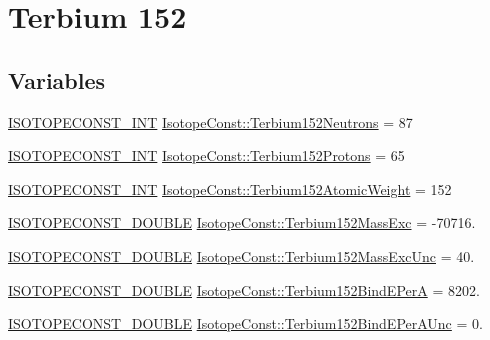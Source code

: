 \hypertarget{group___isotope_const-_terbium-_tb152}{}\section{Terbium 152}
\label{group___isotope_const-_terbium-_tb152}
\subsection*{Variables}
\begin{DoxyCompactItemize}
\item 
\mbox{\hyperlink{group___isotope_const-_macros_ga5f18360b3e99483a35c32d789e62621c}{I\+S\+O\+T\+O\+P\+E\+C\+O\+N\+S\+T\+\_\+\+I\+NT}} \mbox{\hyperlink{group___isotope_const-_terbium-_tb152_ga7084ce1979962d273910095e5ab62c83}{Isotope\+Const\+::\+Terbium152\+Neutrons}} = 87
\item 
\mbox{\hyperlink{group___isotope_const-_macros_ga5f18360b3e99483a35c32d789e62621c}{I\+S\+O\+T\+O\+P\+E\+C\+O\+N\+S\+T\+\_\+\+I\+NT}} \mbox{\hyperlink{group___isotope_const-_terbium-_tb152_ga96676ed9d2f7e475e2cee77dff170939}{Isotope\+Const\+::\+Terbium152\+Protons}} = 65
\item 
\mbox{\hyperlink{group___isotope_const-_macros_ga5f18360b3e99483a35c32d789e62621c}{I\+S\+O\+T\+O\+P\+E\+C\+O\+N\+S\+T\+\_\+\+I\+NT}} \mbox{\hyperlink{group___isotope_const-_terbium-_tb152_gab507a2dcf9811171356e963bf4bd3e6c}{Isotope\+Const\+::\+Terbium152\+Atomic\+Weight}} = 152
\item 
\mbox{\hyperlink{group___isotope_const-_macros_ga8f45a7272ce02c0b4c65c44636ed719a}{I\+S\+O\+T\+O\+P\+E\+C\+O\+N\+S\+T\+\_\+\+D\+O\+U\+B\+LE}} \mbox{\hyperlink{group___isotope_const-_terbium-_tb152_ga27305763a969a2954fe129cad439f58e}{Isotope\+Const\+::\+Terbium152\+Mass\+Exc}} = -\/70716.
\item 
\mbox{\hyperlink{group___isotope_const-_macros_ga8f45a7272ce02c0b4c65c44636ed719a}{I\+S\+O\+T\+O\+P\+E\+C\+O\+N\+S\+T\+\_\+\+D\+O\+U\+B\+LE}} \mbox{\hyperlink{group___isotope_const-_terbium-_tb152_ga85d1b1e2ec510e782707c48f2f52a4b5}{Isotope\+Const\+::\+Terbium152\+Mass\+Exc\+Unc}} = 40.
\item 
\mbox{\hyperlink{group___isotope_const-_macros_ga8f45a7272ce02c0b4c65c44636ed719a}{I\+S\+O\+T\+O\+P\+E\+C\+O\+N\+S\+T\+\_\+\+D\+O\+U\+B\+LE}} \mbox{\hyperlink{group___isotope_const-_terbium-_tb152_gaa1b7f2da831a42be4aa3b41bbe2ce88c}{Isotope\+Const\+::\+Terbium152\+Bind\+E\+PerA}} = 8202.
\item 
\mbox{\hyperlink{group___isotope_const-_macros_ga8f45a7272ce02c0b4c65c44636ed719a}{I\+S\+O\+T\+O\+P\+E\+C\+O\+N\+S\+T\+\_\+\+D\+O\+U\+B\+LE}} \mbox{\hyperlink{group___isotope_const-_terbium-_tb152_gaf53a40e61354db6caf883b320d2d0d16}{Isotope\+Const\+::\+Terbium152\+Bind\+E\+Per\+A\+Unc}} = 0.

\end{DoxyCompactItemize}
